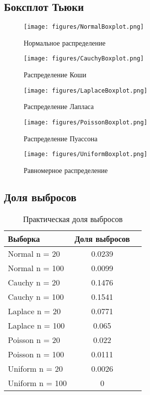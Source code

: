 \documentclass[../main.tex]{subfiles}
\begin{document}
	\subsection{Боксплот Тьюки}
	
	\begin{figure}[H]
        \centering
        \texttt{[image: figures/NormalBoxplot.png]}
        \caption{Нормальное распределение}
        \label{fig:normal}
    \end{figure}
    
    \begin{figure}[H]
        \centering
        \texttt{[image: figures/CauchyBoxplot.png]}
        \caption{Распределение Коши}
        \label{fig:normal}
    \end{figure}
    
    \begin{figure}[H]
        \centering
        \texttt{[image: figures/LaplaceBoxplot.png]}
        \caption{Распределение Лапласа}
        \label{fig:normal}
    \end{figure}
    
     \begin{figure}[H]
        \centering
        \texttt{[image: figures/PoissonBoxplot.png]}
        \caption{Распределение Пуассона}
        \label{fig:normal}
    \end{figure}
    
    \begin{figure}[H]
        \centering
        \texttt{[image: figures/UniformBoxplot.png]}
        \caption{Равномерное распределение}
        \label{fig:normal}
    \end{figure}
    
    \subsection{Доля выбросов}
    \begin{table}[H]
	\centering
	\begin{tabular}{|l|c|c|}
		\hline
		Выборка & Доля выбросов	\\\hline
		\hline
		Normal n = 20 & 0.0239 \\\hline
		Normal n = 100 & 0.0099 \\\hline
		Cauchy n = 20 & 0.1476 \\\hline
		Cauchy n = 100 & 0.1541 \\\hline
		Laplace n = 20 & 0.0771 \\\hline
		Laplace n = 100 & 0.065 \\\hline
		Poisson n = 20 & 0.022 \\\hline
		Poisson n = 100 & 0.0111 \\\hline
		Uniform n = 20 & 0.0026 \\\hline
		Uniform n = 100 & 0 \\\hline
	\end{tabular}
	\caption{Практическая доля выбросов}
    \end{table}
    
\end{document}
